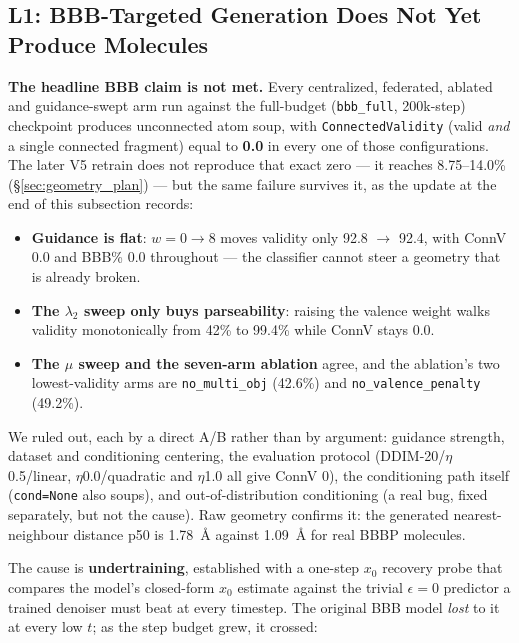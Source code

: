 \documentclass[12pt, a4paper]{article}
\begin{document}
\subsection{L1: BBB-Targeted Generation Does Not Yet Produce Molecules}

\textbf{The headline BBB claim is not met.} Every centralized, federated,
ablated and guidance-swept arm run against the full-budget
(\texttt{bbb\_full}, 200k-step) checkpoint produces unconnected atom soup, with
\texttt{ConnectedValidity} (valid \emph{and} a single connected fragment)
equal to \textbf{0.0} in every one of those configurations. The later V5
retrain does not reproduce that exact zero --- it reaches 8.75--14.0\%
(\S\ref{sec:geometry_plan}) --- but the same failure survives it, as the
update at the end of this subsection records:

\begin{itemize}
    \item \textbf{Guidance is flat}: $w = 0 \to 8$ moves validity only
          92.8 $\to$ 92.4, with ConnV 0.0 and BBB\% 0.0 throughout --- the
          classifier cannot steer a geometry that is already broken.
    \item \textbf{The $\lambda_2$ sweep only buys parseability}: raising the
          valence weight walks validity monotonically from 42\% to 99.4\%
          while ConnV stays 0.0.
    \item \textbf{The $\mu$ sweep and the seven-arm ablation} agree, and the
          ablation's two lowest-validity arms are
          \texttt{no\_multi\_obj} (42.6\%) and \texttt{no\_valence\_penalty}
          (49.2\%).
\end{itemize}

We ruled out, each by a direct A/B rather than by argument: guidance strength,
dataset and conditioning centering, the evaluation protocol
(DDIM-20/$\eta$0.5/linear, $\eta$0.0/quadratic and $\eta$1.0 all give ConnV
0), the conditioning path itself (\texttt{cond=None} also soups), and
out-of-distribution conditioning (a real bug, fixed separately, but not the
cause). Raw geometry confirms it: the generated nearest-neighbour distance p50
is 1.78~\AA{} against 1.09~\AA{} for real BBBP molecules.

The cause is \textbf{undertraining}, established with a one-step $x_0$
recovery probe that compares the model's closed-form $x_0$ estimate against the
trivial $\epsilon = 0$ predictor a trained denoiser must beat at every
timestep. The original BBB model \emph{lost} to it at every low $t$; as the
step budget grew, it crossed:
\end{document}
